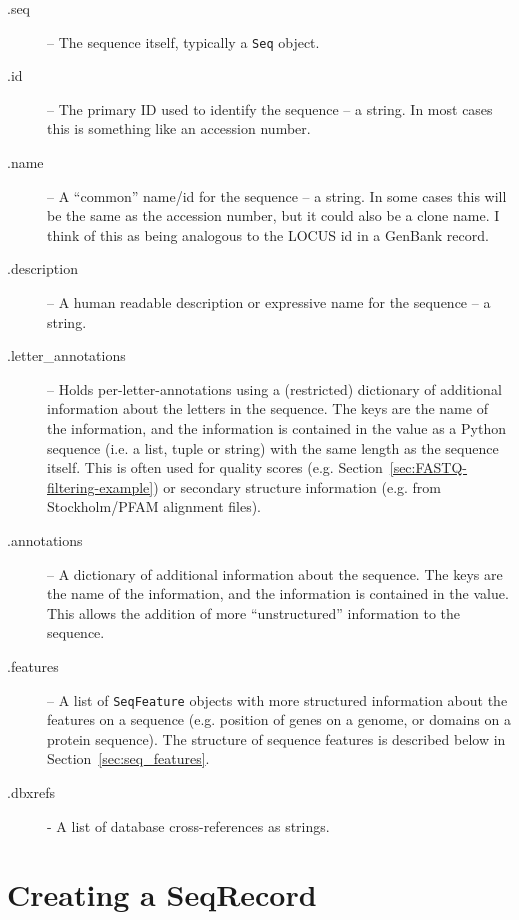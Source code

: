 \begin{description}
  \item[.seq] -- The sequence itself, typically a \verb|Seq| object.

  \item[.id] -- The primary ID used to identify the sequence -- a string. In most cases this is something like an accession number.

  \item[.name] -- A ``common'' name/id for the sequence -- a string. In some cases this will be the same as the accession number, but it could also be a clone name. I think of this as being analogous to the LOCUS id in a GenBank record.

  \item[.description] -- A human readable description or expressive name for the sequence -- a string.

  \item[.letter\_annotations] -- Holds per-letter-annotations using a (restricted) dictionary of additional information about the letters in the sequence. The keys are the name of the information, and the information is contained in the value as a Python sequence (i.e. a list, tuple or string) with the same length as the sequence itself.  This is often used for quality scores (e.g. Section~\ref{sec:FASTQ-filtering-example}) or secondary structure information (e.g. from Stockholm/PFAM alignment files).

  \item[.annotations] -- A dictionary of additional information about the sequence. The keys are the name of the information, and the information is contained in the value. This allows the addition of more ``unstructured'' information to the sequence.

  \item[.features] -- A list of \verb|SeqFeature| objects with more structured information about the features on a sequence (e.g. position of genes on a genome, or domains on a protein sequence). The structure of sequence features is described below in Section~\ref{sec:seq_features}.

  \item[.dbxrefs] - A list of database cross-references as strings.
\end{description}

\section{Creating a SeqRecord}

